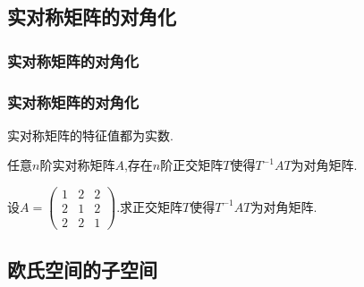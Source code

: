 \subsection{实对称矩阵的对角化}


\subsubsection{实对称矩阵的对角化}
\begin{frame}\frametitle{实对称矩阵的对角化}
\pp
\begin{proposition}
实对称矩阵的特征值都为实数.
\end{proposition}
\pp
{}
\pp

\begin{theorem}
任意$n$阶实对称矩阵$A$,存在$n$阶正交矩阵$T$使得$T^{-1}AT$为对角矩阵.
\end{theorem}

\pp
{}
\pp
\begin{example}
设$A=\begin{pmatrix}1&2&2\\2&1&2\\2&2&1\end{pmatrix}$.求正交矩阵$T$使得$T^{-1}AT$为对角矩阵.
\end{example}
\pp
{}
\end{frame}





\renewcommand{\mydate}{2025年06月10日\ 二十八次课}


\subsection{欧氏空间的子空间}


